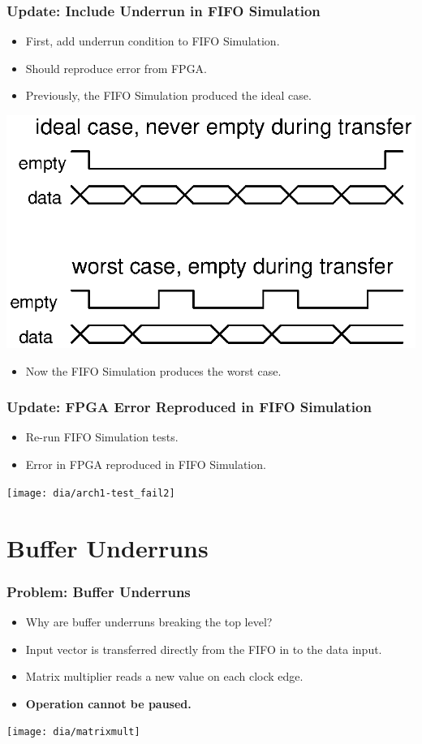 \documentclass[gray]{beamer}
\begin{document}
\begin{frame}
\frametitle{Update: Include Underrun in FIFO Simulation}
\begin{itemize}
\item First, add underrun condition to FIFO Simulation.
\item Should reproduce error from FPGA.
\item Previously, the FIFO Simulation produced the ideal case.
\end{itemize}
\begin{center}
\includegraphics[scale=0.70]{xcircuit/fifosim_timing}
\end{center}
\begin{itemize}
\item Now the FIFO Simulation produces the worst case.
\end{itemize}
\end{frame}

\begin{frame}
\frametitle{Update: FPGA Error Reproduced in FIFO Simulation}
\begin{itemize}
\item Re-run FIFO Simulation tests.
\item Error in FPGA reproduced in FIFO Simulation.
\end{itemize}
\begin{center}
\texttt{[image: dia/arch1-test\_fail2]}
\end{center}
\end{frame}

\section{Buffer Underruns}
\begin{frame}
\frametitle{Problem: Buffer Underruns}
\begin{itemize}
\item Why are buffer underruns breaking the top level?
\item Input vector is transferred directly from the FIFO in to the data input.
\item Matrix multiplier reads a new value on each clock edge.
\item \textbf{Operation cannot be paused.}
\end{itemize}
\begin{center}
\texttt{[image: dia/matrixmult]}
\end{center}
\end{frame}
\end{document}
